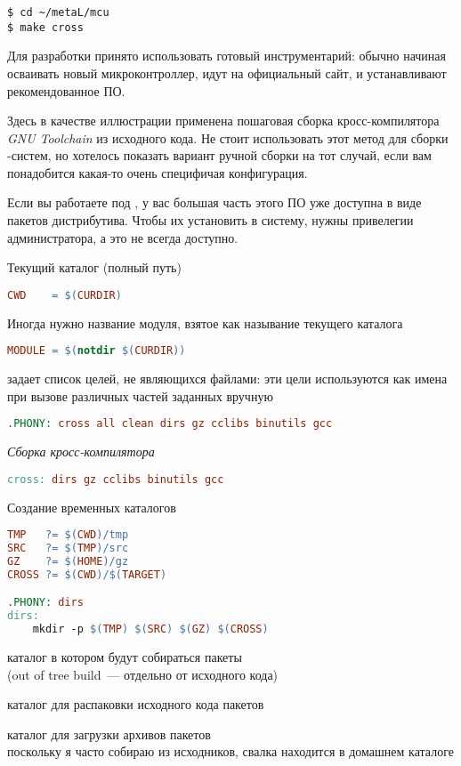 
\begin{verbatim}
$ cd ~/metaL/mcu
$ make cross
\end{verbatim}

Для разработки принято использовать готовый инструментарий: обычно начиная
осваивать новый микроконтроллер, идут на официальный сайт, и устанавливают
рекомендованное ПО.

Здесь в качестве иллюстрации применена пошаговая сборка кросс-компилятора
\emph{GNU Toolchain} из исходного кода. Не стоит использовать этот метод для
сборки \linux-систем, но хотелось показать вариант ручной сборки на тот случай,
если вам понадобится какая-то очень специфичая конфигурация.

Если вы работаете под \linux, у вас большая часть этого ПО уже доступна в виде
пакетов дистрибутива. Чтобы их установить в систему, нужны привелегии
администратора, а это не всегда доступно. 

\clearpage\noindent
Текущий каталог (полный путь)
\begin{lstlisting}[language=make]
CWD    = $(CURDIR)
\end{lstlisting}
Иногда нужно название модуля, взятое как называние текущего каталога
\begin{lstlisting}[language=make]
MODULE = $(notdir $(CURDIR))
\end{lstlisting}
 задает список целей, не являющихся файлами: эти цели используются
как имена при вызове различных частей  заданных вручную
\begin{lstlisting}[language=make]
.PHONY: cross all clean dirs gz cclibs binutils gcc
\end{lstlisting}
\emph{Сборка кросс-компилятора}
\begin{lstlisting}[language=make]
cross: dirs gz cclibs binutils gcc
\end{lstlisting}
Создание временных каталогов
\begin{lstlisting}[language=make]
TMP   ?= $(CWD)/tmp
SRC   ?= $(TMP)/src
GZ    ?= $(HOME)/gz
CROSS ?= $(CWD)/$(TARGET)

.PHONY: dirs
dirs:
	mkdir -p $(TMP) $(SRC) $(GZ) $(CROSS)
\end{lstlisting}
\begin{description}[nosep]
\item[\file{TMP}] каталог в котором будут собираться пакеты\\(out of
tree build\ --- отдельно от исходного кода)
\item[\file{SRC}] каталог для распаковки исходного кода пакетов
\item[\file{GZ}] каталог для загрузки архивов пакетов\\
поскольку я часто собираю из исходников, свалка находится в домашнем каталоге 
\end{description}

